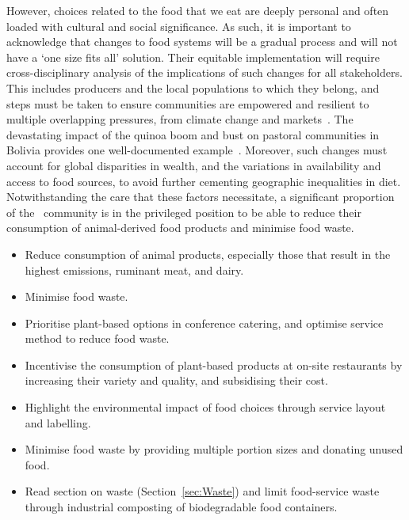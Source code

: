 \documentclass[../SustainableHEP.tex]{subfiles}
\begin{document}
 However, choices related to the food that we eat are deeply personal and often loaded with cultural and social significance. As such, it is important to acknowledge that changes to food systems will be a gradual process and will not have a `one size fits all' solution. Their equitable implementation will require cross-disciplinary analysis of the implications of such changes for all stakeholders. This includes producers and the local populations to which they belong, and steps must be taken to ensure communities are empowered and resilient to multiple overlapping pressures, from climate change and markets~\cite{WalshDilley2020}. The devastating impact of the quinoa boom and bust on pastoral communities in Bolivia provides one well-documented example~\cite{WalshDilley2020, Rodas2021}. Moreover, such changes must account for global disparities in wealth, and the variations in availability and access to food sources, to avoid further cementing geographic inequalities in diet. Notwithstanding the care that these factors necessitate, a significant proportion of the \ACR\ community is in the privileged position to be able to reduce their consumption of animal-derived food products and minimise food waste.


\newpage
\begin{reco2}{\currentname}
{
\begin{itemize}[leftmargin=6 mm]
\setlength{\itemsep}{\recskip}
\item Reduce consumption of animal products, especially those that result in the highest emissions, \eg ruminant meat, and dairy.

\item Minimise food waste.

\end{itemize}
}
{
\begin{itemize}[leftmargin=6 mm]
\setlength{\itemsep}{\recskip}
\item Prioritise plant-based options in conference catering, and optimise service method to reduce food waste.
\end{itemize}
}
{
\begin{itemize}[leftmargin=6 mm]
\setlength{\itemsep}{\recskip}
\item Incentivise the consumption of plant-based products at on-site restaurants by increasing their variety and quality,  and subsidising their cost.

\item Highlight the environmental impact of food choices through service layout and labelling.

\item Minimise food waste by providing multiple portion sizes and donating unused food.

\item Read section on waste (Section~\ref{sec:Waste}) and limit food-service waste \eg through industrial composting of biodegradable food containers.
\end{itemize}}
\end{reco2}
\end{document}
